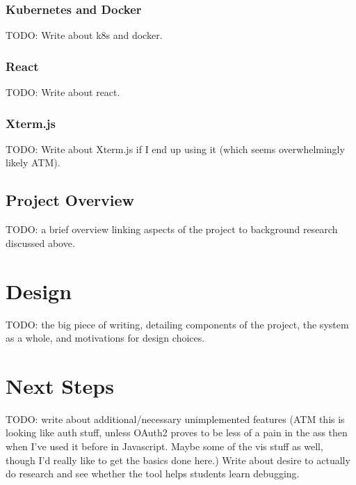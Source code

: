 \documentclass[12pt]{article}
\begin{document}
\subsubsection{Kubernetes and Docker}

TODO: Write about k8s and docker.

\subsubsection{React}

TODO: Write about react.

\subsubsection{Xterm.js}

TODO: Write about Xterm.js if I end up using it (which seems
overwhelmingly likely ATM).

\subsection{Project Overview}

TODO: a brief overview linking aspects of the project to background
research discussed above.

\section{Design}

TODO: the big piece of writing, detailing components of the project,
the system as a whole, and motivations for design choices.

\section{Next Steps}

TODO: write about additional/necessary unimplemented features (ATM
this is looking like auth stuff, unless OAuth2 proves to be less of a
pain in the ass then when I've used it before in Javascript.  Maybe
some of the vis stuff as well, though I'd really like to get the
basics done here.)  Write about desire to actually do research and see
whether the tool helps students learn debugging.

\pagebreak

{}
\end{document}
